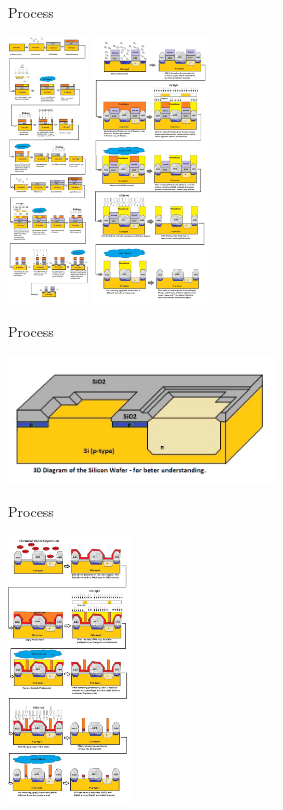 \documentclass[9pt]{beamer}
\begin{document}
\begin{frame}{Process}
	\begin{center}
		\includegraphics[height=200pt]{process1.png}
		\includegraphics[height=200pt]{process2.png}
	\end{center}
\end{frame}

\begin{frame}{Process}
	\begin{center}
		\includegraphics[width=200pt]{end1.png}
	\end{center}
\end{frame}

\begin{frame}{Process}
	\begin{center}
		\includegraphics[height=200pt]{process3.png}
	\end{center}
\end{frame}
\end{document}
